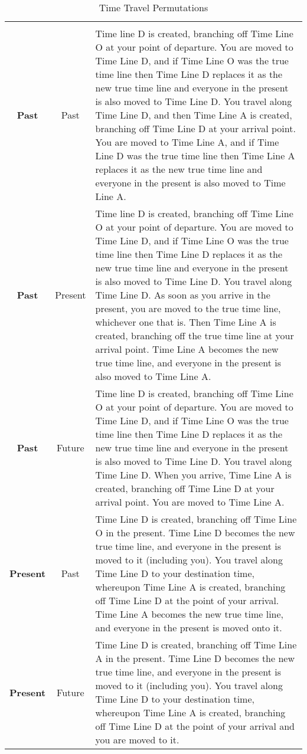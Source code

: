 \begin {table}[H]
  \caption{Time Travel Permutations}\label{tab:Time Travel Permutations}
  \begin{tabularx}{\columnwidth}{>{\bfseries}ccY}
	 &  & \\
	Past & Past & Time line D is created, branching off Time Line O at your point of departure. You are moved to Time Line D, and if Time Line O was the true time line then Time Line D replaces it as the new true time line and everyone in the present is also moved to Time Line D. You travel along Time Line D, and then Time Line A is created, branching off Time Line D at your arrival point. You are moved to Time Line A, and if Time Line D was the true time line then Time Line A replaces it as the new true time line and everyone in the present is also moved to Time Line A.\\
	Past & Present & Time line D is created, branching off Time Line O at your point of departure. You are moved to Time Line D, and if Time Line O was the true time line then Time Line D replaces it as the new true time line and everyone in the present is also moved to Time Line D. You travel along Time Line D. As soon as you arrive in the present, you are moved to the true time line, whichever one that is. Then Time Line A is created, branching off the true time line at your arrival point. Time Line A becomes the new true time line, and everyone in the present is also moved to Time Line A.\\
	Past & Future & Time line D is created, branching off Time Line O at your point of departure. You are moved to Time Line D, and if Time Line O was the true time line then Time Line D replaces it as the new true time line and everyone in the present is also moved to Time Line D. You travel along Time Line D. When you arrive, Time Line A is created, branching off Time Line D at your arrival point. You are moved to Time Line A.\\
	Present & Past & Time Line D is created, branching off Time Line O in the present. Time Line D becomes the new true time line, and everyone in the present is moved to it (including you). You travel along Time Line D to your destination time, whereupon Time Line A is created, branching off Time Line D at the point of your arrival. Time Line A becomes the new true time line, and everyone in the present is moved onto it.\\
	Present & Future & Time Line D is created, branching off Time Line A in the present. Time Line D becomes the new true time line, and everyone in the present is moved to it (including you). You travel along Time Line D to your destination time, whereupon Time Line A is created, branching off Time Line D at the point of your arrival and you are moved to it.\\

\end{tabularx}
\end{table}

